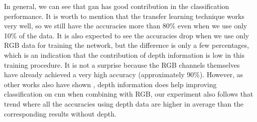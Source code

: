 In general, we can see that \acrshort{gan} has good contribution in the classification
performance. It is worth to mention that the transfer learning technique works very well,
so we still have the accuracies more than 80\% even when we use only 10\% of the data. It
is also expected to see the accuracies drop when we use only RGB data for training the
network, but the difference is only a few percentages, which is an indication that the
contribution of depth information is low in this training procedure. It is not a surprise
because the RGB channels themselves have already achieved a very high accuracy
(approximately 90\%). However, as other works also have shown \cite{eitel, alexandre},
depth information does help improving classification on \acrfull{cnn} when combining with
RGB, our experiment also follows that trend where all the accuracies using depth data are
higher in average than the corresponding results without depth.



